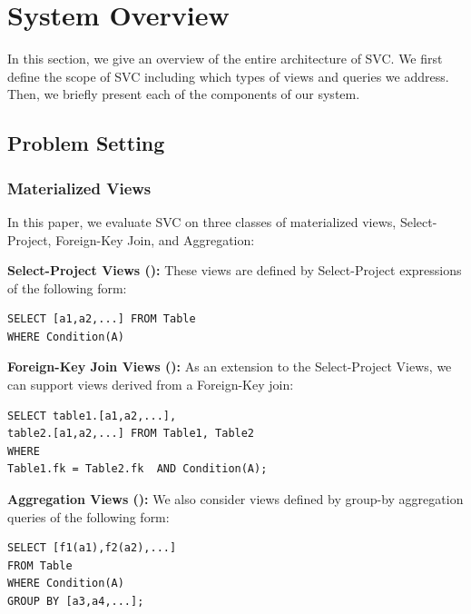 \section{System Overview}\label{sec-arch}
In this section, we give an overview of the entire architecture of SVC.
We first define the scope of SVC including which types of views and queries we address.
Then, we briefly present each of the components of our system.

\subsection{Problem Setting}
\subsubsection{Materialized Views}
In this paper, we evaluate SVC on three classes of materialized views, Select-Project, Foreign-Key Join, and Aggregation:
\vspace{0.5em}

\noindent\textbf{Select-Project Views (\spview): } These views are defined by Select-Project
expressions of the following form:

\begin{lstlisting}
SELECT [a1,a2,...] FROM Table 
WHERE Condition(A) 
\end{lstlisting}

\vspace{0.5em}

\noindent\textbf{Foreign-Key Join Views (\fjview): } As an extension to the Select-Project Views, we can support views derived from a Foreign-Key join:

\begin{lstlisting}
SELECT table1.[a1,a2,...],
table2.[a1,a2,...] FROM Table1, Table2 
WHERE
Table1.fk = Table2.fk  AND Condition(A);
\end{lstlisting}

\vspace{0.5em}

\noindent\textbf{Aggregation Views (\aggview): } We also consider views defined by group-by aggregation queries of the following form:

\begin{lstlisting}
SELECT [f1(a1),f2(a2),...] 
FROM Table 
WHERE Condition(A)
GROUP BY [a3,a4,...];
\end{lstlisting}

